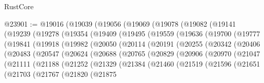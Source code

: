 \begin{lexlean}{RustCore}
\begin{coremodule}
@23901 := @19016
    (@19039
      (@19056
        (@19069
          (@19078
            (@19082
              (@19141
                (@19239
                  (@19278
                    (@19354
                      (@19409
                        (@19495
                          (@19559
                            (@19636
                              (@19700
                                (@19777
                                  (@19841
                                    (@19918
                                      (@19982
                                        (@20050
                                          (@20114
                                            (@20191
                                              (@20255
                                                (@20342
                                                  (@20406
                                                    (@20483
                                                      (@20547
                                                        (@20624
                                                          (@20688
                                                            (@20765
                                                              (@20829
                                                                (@20906
                                                                  (@20970
                                                                    (@21047
                                                                      (@21111
                                                                        (@21188
                                                                          (@21252
                                                                            (@21329
                                                                              (@21384
                                                                                (@21460
                                                                                  (@21519
                                                                                    (@21596
                                                                                      (@21651
                                                                                        (@21703
                                                                                          (@21767
                                                                                            (@21820
                                                                                              (@21875

\end{coremodule}
\end{lexlean}
